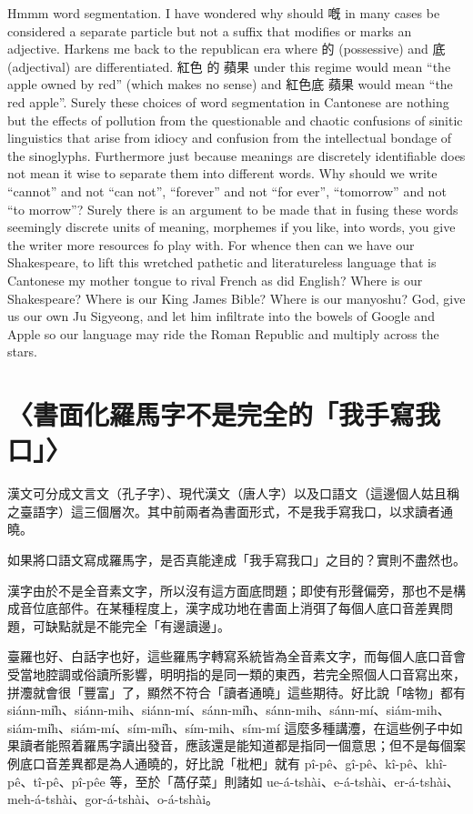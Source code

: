 Hmmm word segmentation. I have wondered why should 嘅 in many cases be considered a separate particle but not a suffix that modifies or marks an adjective. Harkens me back to the republican era where 的 (possessive) and 底 (adjectival) are differentiated. 紅色 的 蘋果 under this regime would mean “the apple owned by red” (which makes no sense) and 紅色底 蘋果  would mean “the red apple”. Surely these choices of word segmentation in Cantonese are nothing but the effects of pollution from the questionable and chaotic confusions of sinitic linguistics that arise from idiocy and confusion from the intellectual bondage of the  sinoglyphs.
Furthermore just because meanings are discretely identifiable does not mean it wise to separate them into different words. Why should we write “cannot” and not “can not”, “forever” and not “for ever”, “tomorrow” and not “to morrow”?
Surely there is an argument to be made that in fusing these words seemingly discrete units of meaning, morphemes if you like, into words, you give the writer more resources fo play with. For whence then can we have our Shakespeare, to lift this wretched pathetic and literatureless language that is Cantonese my mother tongue to rival French as did English? Where is our Shakespeare? Where is our King James Bible? Where is our manyoshu? God, give us our own Ju Sigyeong, and let him infiltrate into the bowels of Google and Apple so our language may ride the Roman Republic and multiply across the stars.





\section{〈書面化羅馬字不是完全的「我手寫我口」〉}

漢文可分成文言文（孔子字）、現代漢文（唐人字）以及口語文（這邊個人姑且稱之臺語字）這三個層次。其中前兩者為書面形式，不是我手寫我口，以求讀者通曉。

如果將口語文寫成羅馬字，是否真能達成「我手寫我口」之目的？實則不盡然也。

漢字由於不是全音素文字，所以沒有這方面底問題；即使有形聲偏旁，那也不是構成音位底部件。在某種程度上，漢字成功地在書面上消弭了每個人底口音差異問題，可缺點就是不能完全「有邊讀邊」。

臺羅也好、白話字也好，這些羅馬字轉寫系統皆為全音素文字，而每個人底口音會受當地腔調或俗讀所影響，明明指的是同一類的東西，若完全照個人口音寫出來，拼灋就會很「豐富」了，顯然不符合「讀者通曉」這些期待。好比說「啥物」都有 siánn-mi̍h、siánn-mih、siánn-mí、sánn-mi̍h、sánn-mih、sánn-mí、siám-mih、siám-mi̍h、siám-mí、sím-mi̍h、sím-mih、sím-mí 這麼多種講灋，在這些例子中如果讀者能照着羅馬字讀出發音，應該還是能知道都是指同一個意思；但不是每個案例底口音差異都是為人通曉的，好比說「枇杷」就有 pî-pê、gî-pê、kî-pê、khî-pê、tî-pê、pî-pêe 等，至於「萵仔菜」則諸如 ue-á-tshài、e-á-tshài、er-á-tshài、meh-á-tshài、gor-á-tshài、o-á-tshài。

